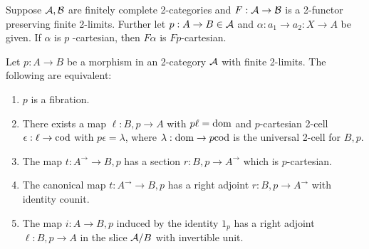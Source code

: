 \documentclass[../thesis.tex]{subfiles}
\begin{document}
\begin{corollary}
  Suppose ${\mathcal{A}}, {\mathcal{B}}$ are finitely complete 2-categories and $F : {\mathcal{A}} \to {\mathcal{B}}$ is a 2-functor preserving finite
  2-limits. Further let $p : A \to B \in {\mathcal{A}}$ and $\alpha : a_1 \to a_2 : X \to A$ be given. If $\alpha$ is $p$%
  -cartesian, then $F\alpha$ is $Fp$-cartesian.
\end{corollary}

\begin{proposition}
  Let $p : A \to B$ be a morphism in an 2-category ${\mathcal{A}}$ with finite 2-limits. The following are equivalent:
  \begin{enumerate}[label=(\arabic*)]
    \item $p$ is a fibration.
    \item There exists a map $\ell : B \comma p \to A$ with $p\ell = {\mathrm{dom}}$ and $p$-cartesian 2-cell $\epsilon :
      \ell \to {\mathrm{cod}}$ with $p\epsilon = \lambda$, where $\lambda : {\mathrm{dom}} \to p{\mathrm{cod}}$ is the universal 2-cell for $B
      \comma p$.
    \item The map $t : A^\to \to B \comma p$ has a section $r : B \comma p \to A^\to$ which is $p$-cartesian.
    \item The canonical map $t : A^\to \to B \comma p$ has a right adjoint $r : B \comma p \to A^\to$
      with identity counit.
    \item The map $i : A \to B \comma p$ induced by the identity $1_p$ has a right adjoint $\ell : B \comma p
      \to A$ in the slice ${\mathcal{A}}/B$ with invertible unit.
  \end{enumerate}
\end{proposition}
\end{document}
